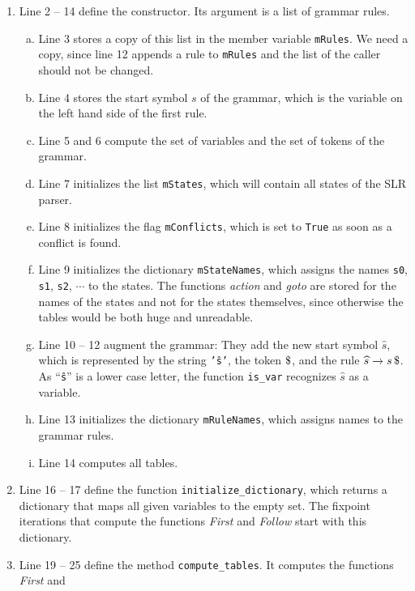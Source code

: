 \begin{enumerate}
\item Line 2 -- 14 define the constructor.  Its argument is a list of grammar rules.
      \begin{enumerate}[(a)]
      \item Line 3 stores a copy of this list in the member variable \texttt{mRules}.  We need a copy, since line
            12 appends a rule to \texttt{mRules} and the list of the caller should not be changed.
      \item Line 4 stores the start symbol $s$ of the grammar, which is the variable on the left hand side of the
            first rule.
      \item Line 5 and 6 compute the set of variables and the set of tokens of the grammar.
      \item Line 7 initializes the list \texttt{mStates}, which will contain all states of the SLR parser.
      \item Line 8 initializes the flag \texttt{mConflicts}, which is set to \texttt{True} as soon as a conflict
            is found.
      \item Line 9 initializes the dictionary \texttt{mStateNames}, which assigns the names \texttt{s0},
            \texttt{s1}, \texttt{s2}, $\cdots$ to the states.  The functions \textsl{action} and \textsl{goto} are
            stored for the names of the states and not for the states themselves, since otherwise the tables
            would be both huge and unreadable.
      \item Line 10 -- 12 augment the grammar:  They add the new start symbol $\widehat{s}$, which is represented
            by the string \texttt{'ŝ'}, the token $\symbol{36}$, and the rule
            $\widehat{s} \rightarrow s\, \symbol{36}$.  As ``\texttt{ŝ}'' is a lower case letter, the function
            \texttt{is\_var} recognizes $\widehat{s}$ as a variable.
      \item Line 13 initializes the dictionary \texttt{mRuleNames}, which assigns names to the grammar rules.
      \item Line 14 computes all tables.
      \end{enumerate}
\item Line 16 -- 17 define the function \texttt{initialize\_dictionary}, which returns a dictionary that maps all
      given variables to the empty set.  The fixpoint iterations that compute the functions \textsl{First} and
      \textsl{Follow} start with this dictionary.
\item Line 19 -- 25 define the method \texttt{compute\_tables}.  It computes the functions \textsl{First} and

\end{enumerate}
